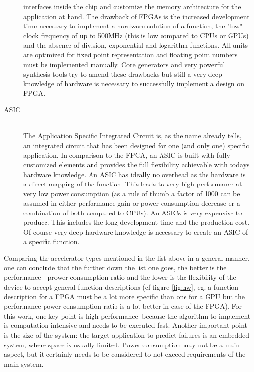 \documentclass[mscthesis]{usiinfthesis}
\begin{document}
\begin{description}
        interfaces inside the chip and customize the memory architecture for
        the application at hand. The drawback of FPGAs is the increased
        development time necessary to implement a hardware solution of
        a function, the "low" clock frequency of up to 500MHz (this is low
        compared to CPUs or GPUs) and the absence of division, exponential and
        logarithm functions. All units are optimized for fixed point
        representation and floating point numbers must be implemented manually.
        Core generators and very powerful synthesis tools try to amend these
        drawbacks but still a very deep knowledge of hardware is necessary to
        successfully implement a design on FPGA.
    \item[ASIC] \hfill \\
        The Application Specific Integrated Circuit is, as the name already
        tells, an integrated circuit that has been designed for one (and only
        one) specific application. In comparison to the FPGA, an ASIC is built
        with fully customized elements and provides the full flexibility
        achievable with todays hardware knowledge. An ASIC has ideally no
        overhead as the hardware is a direct mapping of the function. This
        leads to very high performance at very low power consumption (as a rule
        of thumb a factor of 1000 can be assumed in either performance gain or
        power consumption decrease or a combination of both compared to CPUs).
        An ASICs is very expensive to produce. This includes the long
        development time and the production cost. Of course very deep hardware
        knowledge is necessary to create an ASIC of a specific function.
\end{description}

Comparing the accelerator types mentioned in the list above in a general
manner, one can conclude that the further down the list one goes, the better is
the performance - prower consumption ratio and the lower is the flexibility of
the device to accept general function descriptions (cf figure \ref{fig:hw}, eg.
a function description for a FPGA must be a lot more specific than one for
a GPU but the performance-power consumption ratio is a lot better in case of
the FPGA). For this work, one key point is high performance, because the
algorithm to implement is computation intensive and needs to be executed fast.
Another important point is the size of the system: the target application to
predict failures is an embedded system, where space is usually limited. Power
consumption may not be a main aspect, but it certainly needs to be considered
to not exceed requirements of the main system.
\end{document}
